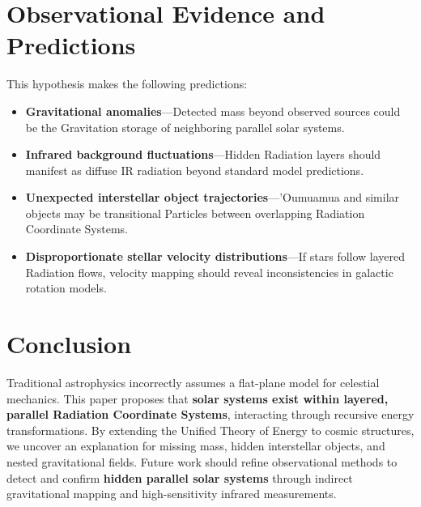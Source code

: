\documentclass{article}
\begin{document}
\section{Observational Evidence and Predictions}
This hypothesis makes the following predictions:
\begin{itemize}
    \item \textbf{Gravitational anomalies}—Detected mass beyond observed sources could be the Gravitation storage of neighboring parallel solar systems.
    \item \textbf{Infrared background fluctuations}—Hidden Radiation layers should manifest as diffuse IR radiation beyond standard model predictions.
    \item \textbf{Unexpected interstellar object trajectories}—'Oumuamua and similar objects may be transitional Particles between overlapping Radiation Coordinate Systems.
    \item \textbf{Disproportionate stellar velocity distributions}—If stars follow layered Radiation flows, velocity mapping should reveal inconsistencies in galactic rotation models.
\end{itemize}

\section{Conclusion}
Traditional astrophysics incorrectly assumes a flat-plane model for celestial mechanics. This paper proposes that \textbf{solar systems exist within layered, parallel Radiation Coordinate Systems}, interacting through recursive energy transformations. By extending the Unified Theory of Energy to cosmic structures, we uncover an explanation for missing mass, hidden interstellar objects, and nested gravitational fields.
Future work should refine observational methods to detect and confirm \textbf{hidden parallel solar systems} through indirect gravitational mapping and high-sensitivity infrared measurements.
\end{document}
